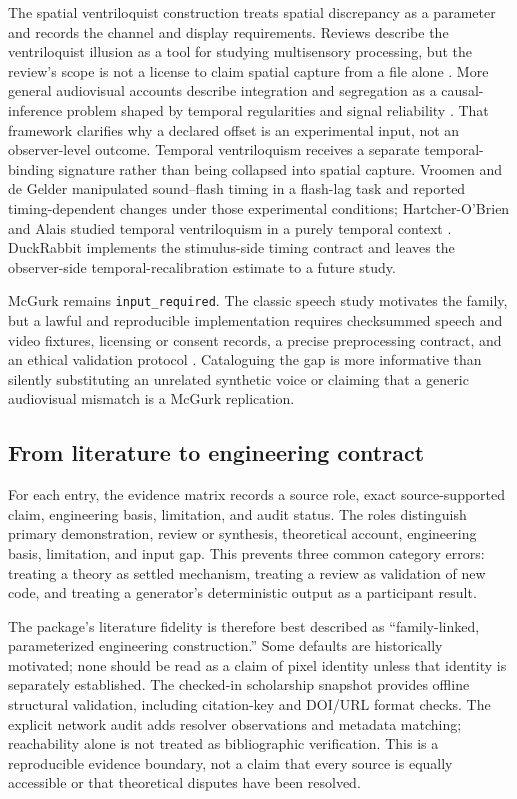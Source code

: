 \documentclass[
  english,
]{article}
\newcounter{none} %
\begin{document}
The spatial ventriloquist construction treats spatial discrepancy as a
parameter and records the channel and display requirements. Reviews
describe the ventriloquist illusion as a tool for studying multisensory
processing, but the review's scope is not a license to claim spatial
capture from a file alone \citep{bruns2019ventriloquist}. More general
audiovisual accounts describe integration and segregation as a
causal-inference problem shaped by temporal regularities and signal
reliability \citep{noppeney2018causal}. That framework clarifies why a
declared offset is an experimental input, not an observer-level outcome.
Temporal ventriloquism receives a separate temporal-binding signature
rather than being collapsed into spatial capture. Vroomen and de Gelder
manipulated sound--flash timing in a flash-lag task and reported
timing-dependent changes under those experimental conditions;
Hartcher-O'Brien and Alais studied temporal ventriloquism in a purely
temporal context
\citep{vroomen2004temporal, hartcherobrien2011temporal}. DuckRabbit
implements the stimulus-side timing contract and leaves the
observer-side temporal-recalibration estimate to a future study.

McGurk remains \texttt{input\_required}. The classic speech study
motivates the family, but a lawful and reproducible implementation
requires checksummed speech and video fixtures, licensing or consent
records, a precise preprocessing contract, and an ethical validation
protocol \citep{mcgurk1976speech}. Cataloguing the gap is more
informative than silently substituting an unrelated synthetic voice or
claiming that a generic audiovisual mismatch is a McGurk replication.

\subsection{From literature to engineering
contract}\label{from-literature-to-engineering-contract}

For each entry, the evidence matrix records a source role, exact
source-supported claim, engineering basis, limitation, and audit status.
The roles distinguish primary demonstration, review or synthesis,
theoretical account, engineering basis, limitation, and input gap. This
prevents three common category errors: treating a theory as settled
mechanism, treating a review as validation of new code, and treating a
generator's deterministic output as a participant result.

The package's literature fidelity is therefore best described as
``family-linked, parameterized engineering construction.'' Some defaults
are historically motivated; none should be read as a claim of pixel
identity unless that identity is separately established. The checked-in
scholarship snapshot provides offline structural validation, including
citation-key and DOI/URL format checks. The explicit network audit adds
resolver observations and metadata matching; reachability alone is not
treated as bibliographic verification. This is a reproducible evidence
boundary, not a claim that every source is equally accessible or that
theoretical disputes have been resolved.
\end{document}
